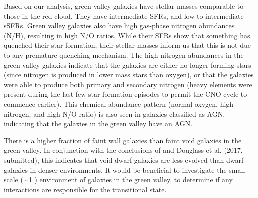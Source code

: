 Based on our analysis, green valley galaxies have stellar masses comparable to 
those in the red cloud.  They have intermediate SFRs, and low-to-intermediate 
sSFRs.  Green valley galaxies also have high gas-phase nitrogen abundances (N/H), 
resulting in high N/O ratios.  While their SFRs show that something has quenched 
their star formation, their stellar masses inform us that this is not due to any 
premature quenching mechanism.  The high nitrogen abundances in the green valley 
galaxies indicate that the galaxies are either no longer forming stars (since 
nitrogen is produced in lower mass stars than oxygen), or that the galaxies were 
able to produce both primary and secondary nitrogen (heavy elements were present 
during the last few star formation episodes to permit the CNO cycle to commence 
earlier).  This chemical abundance pattern (normal oxygen, high nitrogen, and 
high N/O ratio) is also seen in galaxies classified as AGN, indicating that the 
galaxies in the green valley have an AGN.

There is a higher fraction of faint wall galaxies than faint void galaxies in 
the green valley.  In conjunction with the conclusions of \cite{Douglass17b} and 
Douglass et al. (2017, submitted), this indicates that void dwarf galaxies are 
less evolved than dwarf galaxies in denser environments.  It would be beneficial 
to investigate the small-scale ($\sim$1 \hMpc) environment of galaxies in the 
green valley, to determine if any interactions are responsible for the 
transitional state.